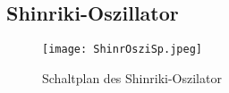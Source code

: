 

\subsection{Shinriki-Oszillator}
\label{sub:aufbauShinriki}

\begin{figure}[h]
    \centering
    \texttt{[image: ShinrOsziSp.jpeg]}
    \label{fig:shinrikiSp}
    \caption{Schaltplan des Shinriki-Oszilator}
\end{figure}